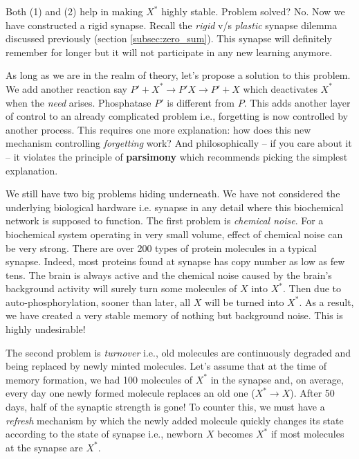 \documentclass[]{resonance}
\begin{document}
Both (1) and (2) help in making $X^*$ highly stable. Problem solved? No.  Now
we have constructed a rigid synapse. Recall the \textit{rigid} v/s
\textit{plastic} synapse dilemma discussed previously (section
\ref{subsec:zero_sum}). This synapse will definitely remember for longer
but it will not participate in any new learning anymore.

As long as we are in the realm of theory, let's propose a solution to this
problem. We add another reaction say $P'+X^*\rightarrow P'X \rightarrow P'+X$
which deactivates $X^*$ when the \textit{need} arises. Phosphatase $P'$ is
different from $P$. This adds another layer of control to an already complicated
problem i.e., forgetting is now controlled by another process. This requires one
more explanation: how does this new mechanism controlling \textit{forgetting}
work?  And philosophically -- if you care about it -- it violates the principle
of \textbf{parsimony} which recommends picking the simplest explanation.

We still have two big problems hiding underneath. We have not considered the
underlying biological hardware i.e. synapse in any detail where this biochemical
network is supposed to function. The first problem is \emph{chemical noise}. For
a biochemical system operating in very small volume, effect of chemical noise
can be very strong.  There are over 200 types of protein molecules in
a typical synapse. Indeed, most proteins found at synapse has copy number as low
as few tens. The brain is always active and the chemical noise caused by the
brain's background activity will surely turn some molecules of $X$ into $X^*$.
Then due to auto-phosphorylation, sooner than later, all $X$ will be turned into
$X^*$. As a result, we have created a very stable memory of nothing but
background noise.  This is highly undesirable!

The second problem is \textit{turnover} i.e., old molecules are continuously
degraded and being replaced by newly minted molecules. Let's assume that at the
time of memory formation, we had 100 molecules of $X^*$ in the synapse and, on
average, every day one newly formed molecule replaces an
old one ($X^* \rightarrow X$).  After 50 days, half of the synaptic strength is
gone! To counter this, we must have a \textit{refresh} mechanism by which the
newly added molecule quickly changes its state according to the state of synapse
i.e., newborn $X$ becomes $X^*$ if most molecules at the synapse are $X^*$.
\end{document}
